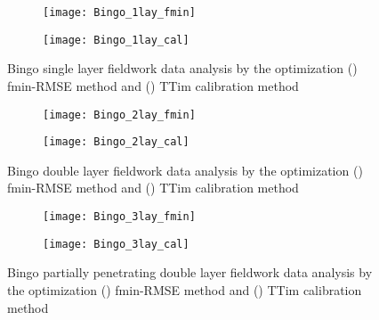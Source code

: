 \begin{figure}[h!]
	\centering
	\begin{subfigure}[b]{0.65\linewidth}
		\centering\texttt{[image: Bingo\_1lay\_fmin]}
		\captionsetup{justification=centering}		
		\caption{\label{fig:Bingo_1lay_fmin}}
		\end{subfigure}\vfill
	\begin{subfigure}[b]{0.65\linewidth}
		\centering\texttt{[image: Bingo\_1lay\_cal]}
		\captionsetup{justification=centering}		
		\caption{\label{fig:Bingo_1lay_cal}}
		\end{subfigure}
	\captionsetup{justification=centering}	
	\caption{Bingo single layer fieldwork data analysis by the optimization () fmin-RMSE method and () TTim calibration method} 
	\label{fig:Bingo_1lay_analysis}
\end{figure} 

\begin{figure}[h!]
	\centering
	\begin{subfigure}[b]{0.65\linewidth}
		\centering\texttt{[image: Bingo\_2lay\_fmin]}
		\captionsetup{justification=centering}		
		\caption{\label{fig:Bingo_2lay_fmin}}
		\end{subfigure}\vfill
	\begin{subfigure}[b]{0.65\linewidth}
		\centering\texttt{[image: Bingo\_2lay\_cal]}
		\captionsetup{justification=centering}		
		\caption{\label{fig:Bingo_2lay_cal}}
		\end{subfigure}
	\captionsetup{justification=centering}	
	\caption{Bingo double layer fieldwork data analysis by the optimization () fmin-RMSE method and () TTim calibration method} 
	\label{fig:Bingo_2lay_analysis}
\end{figure} 

\begin{figure}[h!]
	\centering
	\begin{subfigure}[b]{0.65\linewidth}
		\centering\texttt{[image: Bingo\_3lay\_fmin]}
		\captionsetup{justification=centering}		
		\caption{\label{fig:Bingo_3lay_fmin}}
		\end{subfigure}\vfill
	\begin{subfigure}[b]{0.65\linewidth}
		\centering\texttt{[image: Bingo\_3lay\_cal]}
		\captionsetup{justification=centering}		
		\caption{\label{fig:Bingo_3lay_cal}}
		\end{subfigure}
	\captionsetup{justification=centering}	
	\caption{Bingo partially penetrating double layer fieldwork data analysis by the optimization () fmin-RMSE method and () TTim calibration method} 
	\label{fig:Bingo_3lay_analysis}
\end{figure} 

